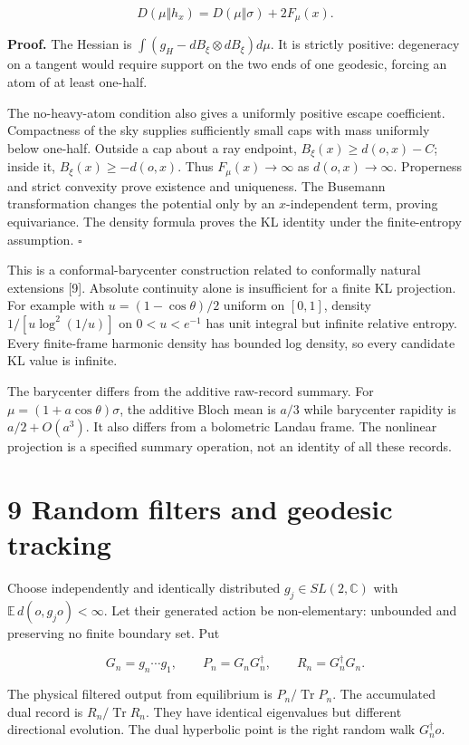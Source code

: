 \documentclass[
  11pt,
  a4paper,
]{article}
\begin{document}
\[D(\mu\Vert h_x)=D(\mu\Vert\sigma)+2F_\mu(x).\]

\textbf{Proof.} The Hessian is \(\int(g_H-dB_\xi\otimes dB_\xi)d\mu\). It is strictly positive: degeneracy on a tangent would require support on the two ends of one geodesic, forcing an atom of at least one-half.

The no-heavy-atom condition also gives a uniformly positive escape coefficient. Compactness of the sky supplies sufficiently small caps with mass uniformly below one-half. Outside a cap about a ray endpoint, \(B_\xi(x)\ge d(o,x)-C\); inside it, \(B_\xi(x)\ge-d(o,x)\). Thus \(F_\mu(x)\to\infty\) as \(d(o,x)\to\infty\). Properness and strict convexity prove existence and uniqueness. The Busemann transformation changes the potential only by an \(x\)-independent term, proving equivariance. The density formula proves the KL identity under the finite-entropy assumption. \(\square\)

This is a conformal-barycenter construction related to conformally natural extensions {[}9{]}. Absolute continuity alone is insufficient for a finite KL projection. For example with \(u=(1-\cos\theta)/2\) uniform on \([0,1]\), density \(1/[u\log^2(1/u)]\) on \(0<u<e^{-1}\) has unit integral but infinite relative entropy. Every finite-frame harmonic density has bounded log density, so every candidate KL value is infinite.

The barycenter differs from the additive raw-record summary. For \(\mu=(1+a\cos\theta)\sigma\), the additive Bloch mean is \(a/3\) while barycenter rapidity is \(a/2+O(a^3)\). It also differs from a bolometric Landau frame. The nonlinear projection is a specified summary operation, not an identity of all these records.

\section{9 Random filters and geodesic tracking}\label{random-filters-and-geodesic-tracking}

Choose independently and identically distributed \(g_j\in SL(2,\mathbb C)\) with \(\mathbb E\,d(o,g_jo)<\infty\). Let their generated action be non-elementary: unbounded and preserving no finite boundary set. Put

\[G_n=g_n\cdots g_1,\qquad
P_n=G_nG_n^\dagger,\qquad R_n=G_n^\dagger G_n.\]

The physical filtered output from equilibrium is \(P_n/\operatorname{Tr}P_n\). The accumulated dual record is \(R_n/\operatorname{Tr}R_n\). They have identical eigenvalues but different directional evolution. The dual hyperbolic point is the right random walk \(G_n^\dagger o\).
\end{document}
